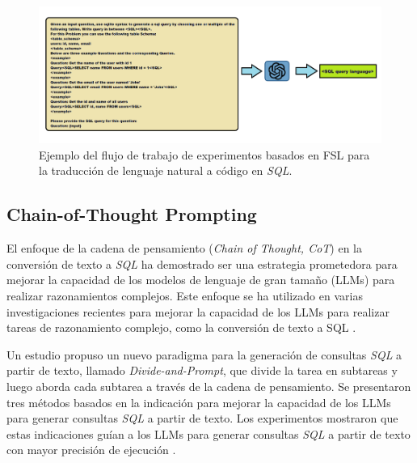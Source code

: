 \begin{figure}[H]\label{fslpromtpsql}
	\centering
	\includegraphics[width = 1\textwidth]{./Graphics/fslpromptsql}
	\caption{Ejemplo del flujo de trabajo de experimentos basados en FSL para la traducción de lenguaje natural a código en \textit{SQL}.}
\end{figure}

\subsection{Chain-of-Thought Prompting} \label{llm_approach_cot}

El enfoque de la cadena de pensamiento (\textit{Chain of Thought, CoT}) \cite{llmsoverview} en la conversión de texto a \textit{SQL} ha demostrado ser una estrategia prometedora para mejorar la capacidad de los modelos de lenguaje de gran tamaño (LLMs) para realizar razonamientos complejos. Este enfoque se ha utilizado en varias investigaciones recientes para mejorar la capacidad de los LLMs para realizar tareas de razonamiento complejo, como la conversión de texto a SQL \cite{cotllmssql1}.

Un estudio propuso un nuevo paradigma para la generación de consultas \textit{SQL} a partir de texto, llamado \textit{Divide-and-Prompt}, que divide la tarea en subtareas y luego aborda cada subtarea a través de la cadena de pensamiento. Se presentaron tres métodos basados en la indicación para mejorar la capacidad de los LLMs para generar consultas \textit{SQL} a partir de texto. Los experimentos mostraron que estas indicaciones guían a los LLMs para generar consultas \textit{SQL} a partir de texto con mayor precisión de ejecución \cite{cotllmssql2}.

